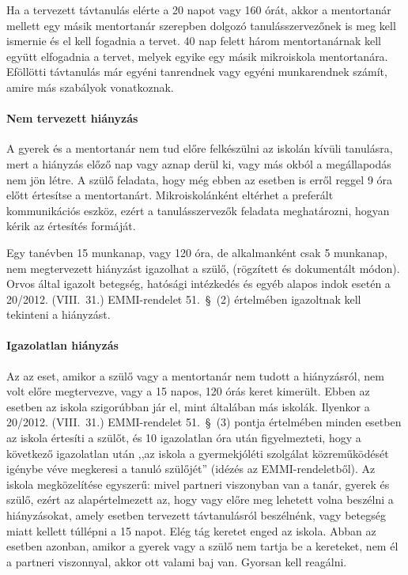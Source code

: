 Ha a tervezett távtanulás elérte a 20 napot vagy 160 órát, akkor a mentortanár mellett egy másik mentortanár szerepben dolgozó tanulásszervezőnek is meg kell ismernie és el kell fogadnia a tervet. 40 nap felett három mentortanárnak kell együtt elfogadnia a tervet, melyek egyike egy másik mikroiskola mentortanára. Eföllötti távtanulás már egyéni tanrendnek vagy egyéni munkarendnek számít, amire más szabályok vonatkoznak.


\paragraph{Nem tervezett hiányzás} A gyerek és a mentortanár nem tud előre felkészülni az iskolán kívüli tanulásra, mert a hiányzás előző nap vagy aznap derül ki, vagy más okból a megállapodás nem jön létre. A szülő feladata, hogy még ebben az esetben is erről reggel 9 óra előtt értesítse a mentortanárt. Mikroiskolánként eltérhet a preferált kommunikációs eszköz, ezért a tanulásszervezők feladata meghatározni, hogyan kérik az értesítés formáját.

Egy tanévben 15 munkanap, vagy 120 óra, de alkalmanként csak 5 munkanap, nem megtervezett hiányzást igazolhat a szülő, 
(rögzített és dokumentált módon). Orvos által igazolt betegség, hatósági intézkedés és egyéb alapos indok esetén a 20/2012. (VIII.~31.) EMMI-rendelet 51.~§~(2) értelmében igazoltnak kell tekinteni a hiányzást.

\paragraph{Igazolatlan hiányzás} Az az eset, amikor a szülő vagy a mentortanár nem tudott a hiányzásról, nem volt előre megtervezve, vagy a 15 napos, 120 órás keret kimerült. Ebben az esetben az iskola szigorúbban jár el, mint általában más iskolák. Ilyenkor a 20/2012. (VIII.~31.) EMMI-rendelet 51.~§~(3) pontja értelmében minden esetben az iskola értesíti a szülőt, és 10 igazolatlan óra után figyelmezteti, hogy a következő igazolatlan után ,,az iskola a gyermekjóléti szolgálat közreműködését igénybe véve megkeresi a tanuló szülőjét'' (idézés az EMMI-rendeletből). Az iskola megközelítése egyszerű: mivel partneri viszonyban van a tanár, gyerek és szülő, ezért az alapértelmezett az, hogy vagy előre meg lehetett volna beszélni a hiányzásokat, amely esetben tervezett távtanulásról beszélnénk, vagy betegség miatt kellett túllépni a 15 napot. Elég tág keretet enged az iskola. Abban az esetben azonban, amikor a gyerek vagy a szülő nem tartja be a kereteket, nem él a partneri viszonnyal, akkor ott valami baj van. Gyorsan kell reagálni.

